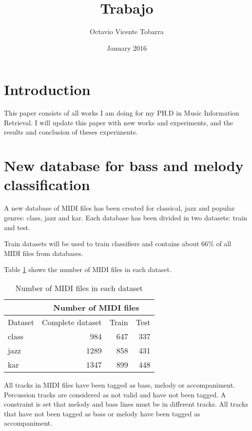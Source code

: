 \documentclass{article}
\title{Trabajo}
\author{Octavio Vicente Tobarra }
\date{January 2016}
\begin{document}
\maketitle







\section{Introduction}

This paper consists of all works I am doing for my PH.D in Music Information Retrieval.
I will update this paper with new works and experiments, and the results and conclusion
of theses experiments.


\section{New database for bass and melody classification}

A new database of MIDI files has been created for classical, jazz and popular genres: class, jazz and kar. Each database has been divided in two datasets: train and test. 

Train datasets will be used to train classifiers and contains about 66\% of all MIDI
files from databases. 

Table \ref{table1} shows the number of MIDI files in each dataset.


\begin{table}
\begin{center}
\begin{tabular}{  l | r  | r | r }
\hline
 & \multicolumn{3}{|c}{Number of MIDI files}  \\
\hline
Dataset & Complete dataset & Train & Test \\
\hline
\hline
class & 984 & 647 & 337 \\
\hline
jazz & 1289 & 858 & 431 \\
\hline
kar & 1347 & 899 & 448 \\
\hline
\end{tabular}
\caption{Number of MIDI files in each dataset}
\label{table1}
\end{center}
\end{table}

All tracks in MIDI files have been tagged as bass, melody or accompaniment. Percussion tracks are considered as not valid and have not been tagged. A constraint is set that melody and bass lines must be in different tracks. All tracks that have not been 
tagged as bass or melody have been tagged as accompaniment.
\end{document}
